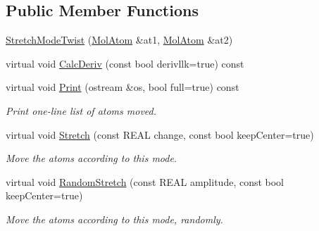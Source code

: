 \subsection*{Public Member Functions}
\begin{DoxyCompactItemize}
\item 
\mbox{\hyperlink{struct_obj_cryst_1_1_stretch_mode_twist_a6ed224b06c93f630ccb7bf7920f054a9}{Stretch\+Mode\+Twist}} (\mbox{\hyperlink{class_obj_cryst_1_1_mol_atom}{Mol\+Atom}} \&at1, \mbox{\hyperlink{class_obj_cryst_1_1_mol_atom}{Mol\+Atom}} \&at2)
\item 
virtual void \mbox{\hyperlink{struct_obj_cryst_1_1_stretch_mode_twist_afbc57b887f9c886b3642d0b7368fd4ad}{Calc\+Deriv}} (const bool derivllk=true) const
\item 
\mbox{\label{struct_obj_cryst_1_1_stretch_mode_twist_a4d9ddf5caed88f32e013d1d286e979f2}} 
virtual void \mbox{\hyperlink{struct_obj_cryst_1_1_stretch_mode_twist_a4d9ddf5caed88f32e013d1d286e979f2}{Print}} (ostream \&os, bool full=true) const
\begin{DoxyCompactList}\small\item\em Print one-\/line list of atoms moved. \end{DoxyCompactList}\item 
\mbox{\label{struct_obj_cryst_1_1_stretch_mode_twist_a89b177c567b0b61162b88205a0009583}} 
virtual void \mbox{\hyperlink{struct_obj_cryst_1_1_stretch_mode_twist_a89b177c567b0b61162b88205a0009583}{Stretch}} (const R\+E\+AL change, const bool keep\+Center=true)
\begin{DoxyCompactList}\small\item\em Move the atoms according to this mode. \end{DoxyCompactList}\item 
\mbox{\label{struct_obj_cryst_1_1_stretch_mode_twist_adb8145423cd1e43d6ced7ef73f1815d4}} 
virtual void \mbox{\hyperlink{struct_obj_cryst_1_1_stretch_mode_twist_adb8145423cd1e43d6ced7ef73f1815d4}{Random\+Stretch}} (const R\+E\+AL amplitude, const bool keep\+Center=true)
\begin{DoxyCompactList}\small\item\em Move the atoms according to this mode, randomly. \end{DoxyCompactList}\end{DoxyCompactItemize}
